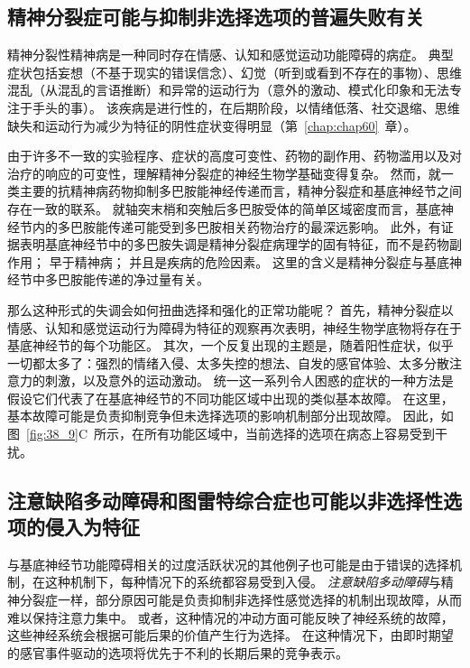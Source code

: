 \subsection{精神分裂症可能与抑制非选择选项的普遍失败有关}

精神分裂性精神病是一种同时存在情感、认知和感觉运动功能障碍的病症。
典型症状包括妄想（不基于现实的错误信念）、幻觉（听到或看到不存在的事物）、思维混乱（从混乱的言语推断）和异常的运动行为（意外的激动、模式化印象和无法专注于手头的事）。
该疾病是进行性的，在后期阶段，以情绪低落、社交退缩、思维缺失和运动行为减少为特征的阴性症状变得明显（第~\ref{chap:chap60}~章）。


由于许多不一致的实验程序、症状的高度可变性、药物的副作用、药物滥用以及对治疗的响应的可变性，理解精神分裂症的神经生物学基础变得复杂。
然而，就一类主要的抗精神病药物抑制多巴胺能神经传递而言，精神分裂症和基底神经节之间存在一致的联系。
就轴突末梢和突触后多巴胺受体的简单区域密度而言，基底神经节内的多巴胺能传递可能受到多巴胺相关药物治疗的最深远影响。
此外，有证据表明基底神经节中的多巴胺失调是精神分裂症病理学的固有特征，而不是药物副作用；
早于精神病；
并且是疾病的危险因素。
这里的含义是精神分裂症与基底神经节中多巴胺能传递的净过量有关。


那么这种形式的失调会如何扭曲选择和强化的正常功能呢？
首先，精神分裂症以情感、认知和感觉运动行为障碍为特征的观察再次表明，神经生物学底物将存在于基底神经节的每个功能区。
其次，一个反复出现的主题是，随着阳性症状，似乎一切都太多了：强烈的情绪入侵、太多失控的想法、自发的感官体验、太多分散注意力的刺激，以及意外的运动激动。
统一这一系列令人困惑的症状的一种方法是假设它们代表了在基底神经节的不同功能区域中出现的类似基本故障。
在这里，基本故障可能是负责抑制竞争但未选择选项的影响机制部分出现故障。
因此，如图~\ref{fig:38_9}C~所示，在所有功能区域中，当前选择的选项在病态上容易受到干扰。



\subsection{注意缺陷多动障碍和图雷特综合症也可能以非选择性选项的侵入为特征}

与基底神经节功能障碍相关的过度活跃状况的其他例子也可能是由于错误的选择机制，在这种机制下，每种情况下的系统都容易受到入侵。
\textit{注意缺陷多动障碍}与精神分裂症一样，部分原因可能是负责抑制非选择性感觉选择的机制出现故障，从而难以保持注意力集中。
或者，这种情况的冲动方面可能反映了神经系统的故障，这些神经系统会根据可能后果的价值产生行为选择。
在这种情况下，由即时期望的感官事件驱动的选项将优先于不利的长期后果的竞争表示。


